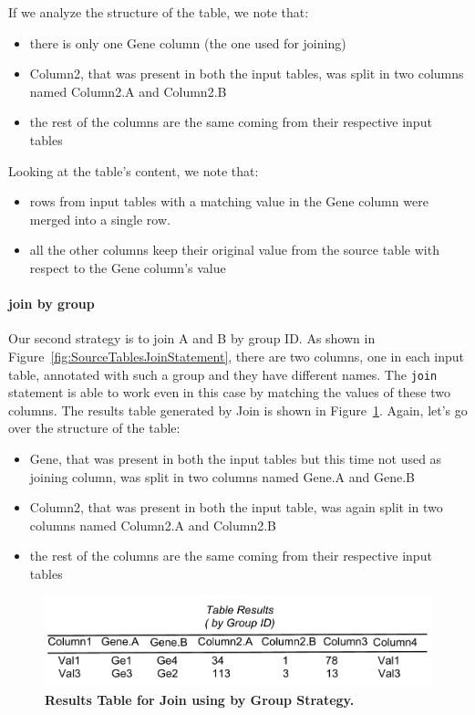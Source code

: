 If we analyze the structure of the table, we note that:
\begin{itemize}
  \item there is only one Gene column (the one used for joining)
  \item Column2, that was present in both the input tables, was split in two columns named Column2.A and Column2.B
  \item the rest of the columns are the same coming from their respective input tables
\end{itemize} 
Looking at the table's content, we note that:
\begin{itemize}
	\item rows from input tables with a matching value in the Gene column were merged into a single row.  
	\item all the other columns keep their original value from the source table with respect to the Gene column's value
\end{itemize}



\paragraph{join by group}
Our second strategy is to join A and B by group ID. As shown in Figure~\ref{fig:SourceTablesJoinStatement}, there are two columns, one in each input table, annotated with such a group and they have different names. The \texttt{join} statement is able to work even in this case by matching the values of these two columns. The results table generated by Join is shown in Figure~\ref{fig:ResultsTableJoinByGroupStatement}. Again, let's go over the structure of the table:
\begin{itemize}
	\item Gene, that was present in both the input tables but this time not used as joining column, was split in two columns named Gene.A and Gene.B
	\item Column2, that was present in both the input table, was again split in two columns named Column2.A and Column2.B
    \item the rest of the columns are the same coming from their respective input tables
\end{itemize}
\begin{figure}[h!tbp]
  \centering
  \includegraphics[width=\figWidthNarrow]{figures/JoinA-BbyGroup.pdf}
\caption[Results Table for Join using by Group Strategy.]{\textbf{Results Table for Join using by Group Strategy.}}
\label{fig:ResultsTableJoinByGroupStatement}
\end{figure}

